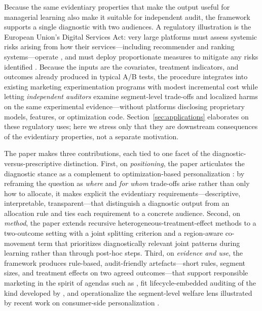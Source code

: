 \documentclass[11pt,letterpaper,english]{article}
\theoremstyle{definition}
\theoremstyle{definition}
\begin{document}
\begin{bibunit}
Because the same evidentiary properties that make the output useful for managerial learning also make it suitable for independent audit, the framework supports a single diagnostic with two audiences. A regulatory illustration is the European Union's Digital Services Act: very large platforms must assess systemic risks arising from how their services---including recommender and ranking systems---operate \citep{dsa2022article34}, and must deploy proportionate measures to mitigate any risks identified \citep{dsa2022article35}. Because the inputs are the covariates, treatment indicators, and outcomes already produced in typical A/B tests, the procedure integrates into existing marketing experimentation programs with modest incremental cost while letting \emph{independent auditors} examine segment-level trade-offs and localized harms on the same experimental evidence---without platforms disclosing proprietary models, features, or optimization code. Section~\ref{sec:applications} elaborates on these regulatory uses; here we stress only that they are downstream consequences of the evidentiary properties, not a separate motivation.

The paper makes three contributions, each tied to one facet of the diagnostic-versus-prescriptive distinction. First, on \emph{positioning}, the paper articulates the diagnostic stance as a complement to optimization-based personalization \citep{rafieian2025multiobjective, ascarza2024doingmore, athey2021policy}: by reframing the question as \emph{where} and \emph{for whom} trade-offs arise rather than only how to allocate, it makes explicit the evidentiary requirements---descriptive, interpretable, transparent---that distinguish a diagnostic output from an allocation rule and ties each requirement to a concrete audience. Second, on \emph{method}, the paper extends recursive heterogeneous-treatment-effect methods \citep{athey2016recursive, wager2018estimation, athey2019grf, kunzel2019metalearners, nie2021quasioracle} to a two-outcome setting with a joint splitting criterion and a region-aware co-movement term that prioritizes diagnostically relevant joint patterns during learning rather than through post-hoc steps. Third, on \emph{evidence and use}, the framework produces rule-based, audit-friendly artefacts---short rules, segment sizes, and treatment effects on two agreed outcomes---that support responsible marketing in the spirit of agendas such as \citet{chandy2021better}, fit lifecycle-embedded auditing of the kind developed by \citet{raji2020_internal_audit}, and operationalize the segment-level welfare lens illustrated by recent work on consumer-side personalization \citep{donnelly2024welfare}.


\end{bibunit}
\end{document}
